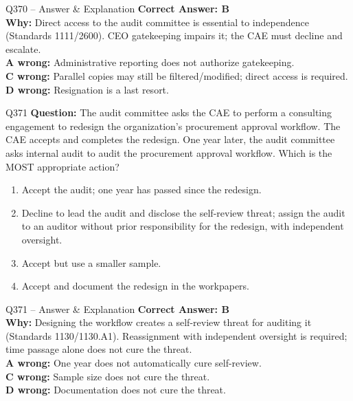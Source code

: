 \documentclass[aspectratio=169,10pt]{beamer}
\begin{document}
	\begin{frame}[t]{Q370 -- Answer \& Explanation}
		\small
		\textbf{Correct Answer: B} \\[4pt]
		\textbf{Why:} Direct access to the audit committee is essential to independence (Standards 1111/2600). CEO gatekeeping impairs it; the CAE must decline and escalate. \\[4pt]
		\textbf{A wrong:} Administrative reporting does not authorize gatekeeping. \\[2pt]
		\textbf{C wrong:} Parallel copies may still be filtered/modified; direct access is required. \\[2pt]
		\textbf{D wrong:} Resignation is a last resort.
	\end{frame}
	
	\begin{frame}[t]{Q371}
		\small
		\textbf{Question:} The audit committee asks the CAE to perform a consulting engagement to redesign the organization's procurement approval workflow. The CAE accepts and completes the redesign. One year later, the audit committee asks internal audit to audit the procurement approval workflow. Which is the MOST appropriate action?
		\begin{enumerate}[label=\Alph*.,itemsep=1pt,topsep=2pt]
			\item Accept the audit; one year has passed since the redesign.
			\item Decline to lead the audit and disclose the self-review threat; assign the audit to an auditor without prior responsibility for the redesign, with independent oversight.
			\item Accept but use a smaller sample.
			\item Accept and document the redesign in the workpapers.
		\end{enumerate}
	\end{frame}
	
	\begin{frame}[t]{Q371 -- Answer \& Explanation}
		\small
		\textbf{Correct Answer: B} \\[4pt]
		\textbf{Why:} Designing the workflow creates a self-review threat for auditing it (Standards 1130/1130.A1). Reassignment with independent oversight is required; time passage alone does not cure the threat. \\[4pt]
		\textbf{A wrong:} One year does not automatically cure self-review. \\[2pt]
		\textbf{C wrong:} Sample size does not cure the threat. \\[2pt]
		\textbf{D wrong:} Documentation does not cure the threat.
	\end{frame}
	
\end{document}
